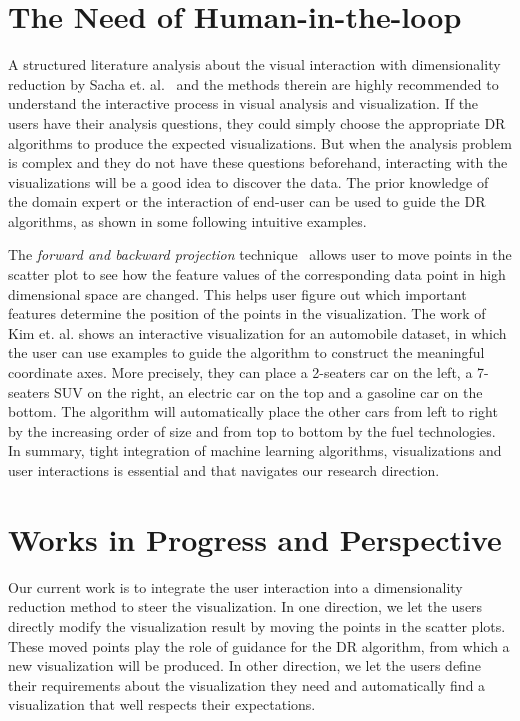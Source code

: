 \section{The Need of Human-in-the-loop}
A structured literature analysis about the visual interaction with dimensionality reduction by Sacha et. al.~\cite{Sacha2017Interaction} and the methods therein are highly recommended to understand the interactive process in visual analysis and visualization.
If the users have their analysis questions, they could simply choose the appropriate DR algorithms to produce the expected visualizations.
But when the analysis problem is complex and they do not have these questions beforehand, interacting with the visualizations will be a good idea to discover the data.
The prior knowledge of the domain expert or the interaction of end-user can be used to guide the DR algorithms, as shown in some following intuitive examples.

The \emph{forward and backward projection} technique~\cite{cavallo2017FWBW} allows user to move points in the scatter plot to see how the feature values of the corresponding data point in high dimensional space are changed. This helps user figure out which important features determine the position of the points in the visualization.
The work of Kim et. al. \cite{Kim2016InterAxis} shows an interactive visualization for an automobile dataset, in which the user can use examples to guide the algorithm to construct the meaningful coordinate axes.
More precisely, they can place a 2-seaters car on the left, a 7-seaters SUV on the right, an electric car on the top and a gasoline car on the bottom. The algorithm will automatically place the other cars from left to right by the increasing order of size and from top to bottom by the fuel technologies.
In summary, tight integration of machine learning algorithms, visualizations and user interactions is essential and that navigates our research direction.


\section{Works in Progress and Perspective}

Our current work is to integrate the user interaction into a dimensionality reduction method to steer the visualization.
In one direction, we let the users directly modify the visualization result by moving the points in the scatter plots.
These moved points play the role of guidance for the DR algorithm, from which a new visualization will be produced.
In other direction, we let the users define their requirements about the visualization they need and automatically find a visualization that well respects their expectations.

